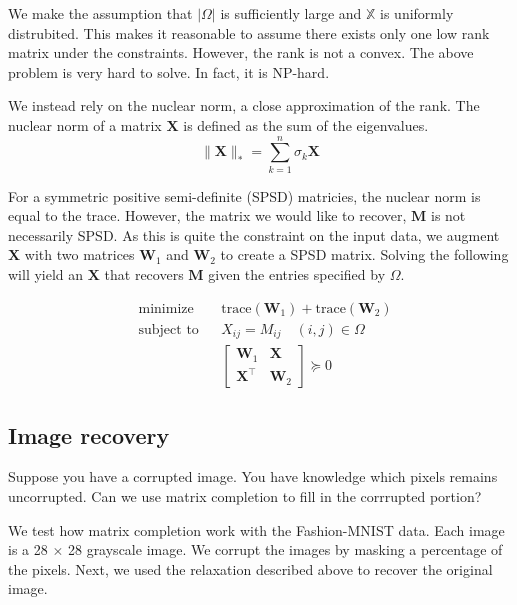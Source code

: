 \documentclass{article}
\begin{document}
We make the assumption that $|\Omega|$ is sufficiently large and $\mathbb{X}$ is uniformly distrubited. 
This makes it reasonable to assume there exists only one low rank matrix under the constraints. 
However, the rank is not a convex. The above problem is very hard to solve. In fact, it is NP-hard. 

We instead rely on the nuclear norm, a close approximation of the rank. The nuclear norm of a matrix $\mathbf{X}$ is defined as the sum of 
the eigenvalues.
\[
\lVert \mathbf{X} \rVert_* = \sum_{k=1}^n \sigma_k {\mathbf{X}}  
\]

For a symmetric positive semi-definite (SPSD) matricies, the nuclear norm is equal to the trace. 
However, the matrix we would like to recover, $\mathbf{M}$ is not necessarily SPSD.
As this is quite the constraint on the input data, we augment $\mathbf{X}$ with two matrices 
$\mathbf{W}_1$ and $\mathbf{W}_2$ to create a SPSD matrix. Solving the following will yield an 
$\mathbf{X}$ that recovers $\mathbf{M}$ given the entries specified by $\Omega$.

\begin{equation*}
  \begin{aligned}
  & {\text{minimize}}
  & & \text{trace}(\mathbf{W}_1) + \text{trace}(\mathbf{W}_2) \\[1pt]
  & \text{subject to}
  & & X_{ij} = M_{ij} \quad (i,j) \in \Omega\\[1pt]
  &&& \begin{bmatrix} 
    \mathbf{W}_1 & \mathbf{X} \\
    \mathbf{X}^\top & \mathbf{W}_2
  \end{bmatrix} \succeq 0 
  \end{aligned}
\end{equation*}


\subsection{Image recovery}

Suppose you have a corrupted image. You have knowledge which pixels remains uncorrupted. Can we use matrix completion to
fill in the corrrupted portion? 

We test how matrix completion work with the Fashion-MNIST data. Each image is a 28 $\times$ 28 grayscale image. 
We corrupt the images by masking a percentage of the pixels. Next, we used the relaxation described above to 
recover the original image. 
\end{document}
